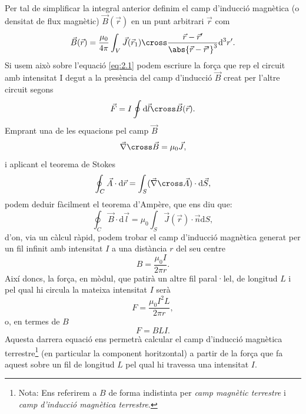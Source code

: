 \documentclass[a4paper,10.5pt]{report}
\begin{document}
Per tal de simplificar la integral anterior definim el camp d'inducció magnètica (o densitat de flux magnètic) $\vec{B}(\vec{r})$ en un punt arbitrari $\vec{r}$ com
\begin{equation}
	\vec{B}(\vec{r}) = \frac{\mu_0}{4\pi} \int_V \vec{J}(\vec{r}_1)\cross\frac{\vec{r}-\vec{r}'}{\abs{\vec{r}-\vec{r}'}^3}\mathrm{d}^3r'.
\end{equation} 
Si usem això sobre l'equació \eqref{eq:2.1} podem escriure la força que rep el circuit amb intensitat I degut a la presència del camp d'inducció $\vec{B}$ creat per l'altre circuit segons
\begin{equation}
	\vec{F} = I \oint \mathrm{d}\vec{l}\cross\vec{B}(\vec{r}). \label{eq2:3}
\end{equation}
Emprant una de les equacions pel camp $\vec{B}$
\begin{equation}
	\vec{\nabla}\cross \vec{B} = \mu_0 \vec{J},
\end{equation}
i aplicant el teorema de Stokes
\begin{equation}
	\oint_C \vec{A} \cdot \mathrm{d}\vec{r} = \int_S (\vec{\nabla}\cross \vec{A})\cdot \mathrm{d}\vec{S},
\end{equation}
podem deduir fàcilment el teorema d'Ampère, que ens diu que:
\begin{equation}
	\oint_C\vec{B}\cdot\mathrm{d}\vec{l} = \mu_0\int_S\vec{J}(\vec{r})\cdot\vec{n}\mathrm{d}S,
	\label{eq2:6}
\end{equation}
d'on, via un càlcul ràpid, podem trobar el camp d'inducció magnètica generat per un fil infinit amb intensitat $I$ a una distància $r$ del seu centre
\begin{equation}
	B = \frac{\mu_0 I}{2\pi r}. \label{eq2:7}
\end{equation}
Així doncs, la força, en mòdul, que patirà un altre fil paral·lel, de longitud $L$  i pel qual hi circula la mateixa intensitat $I$ serà
\begin{equation}
	F = \frac{\mu_0 I^2L}{2\pi r}, \label{eq2:8}
\end{equation} 
o, en termes de $B$
\begin{equation}
	F = BLI. \label{eq:2.campmagnetic}
\end{equation}
Aquesta darrera equació ens permetrà calcular el camp d'inducció magnètica terrestre\footnote{Nota: Ens referirem a $B$ de forma indistinta per \textit{camp magnètic terrestre} i \textit{camp d'inducció magnètica terrestre}.} (en particular la component horitzontal) a partir de la força que fa aquest sobre un fil de longitud $L$ pel qual hi travessa una intensitat $I$.
\end{document}
